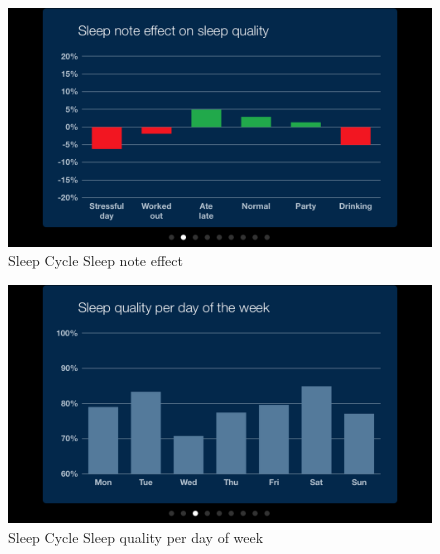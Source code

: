 \begin{figure}[]
	\centering
    \includegraphics[scale=0.3]{images/SleepCycle/SleepNoteEffectOnSleepQuality} 
    \caption{Sleep Cycle Sleep note effect}
    \label{fig:SCDetail}
\end{figure}

\begin{figure}[]
    \centering
    \includegraphics[scale=0.3]{images/SleepCycle/SleepQualityPerDayOfWeek}  
    \caption{Sleep Cycle Sleep quality per day of week}
    \label{fig:SCSettings}
\end{figure}


